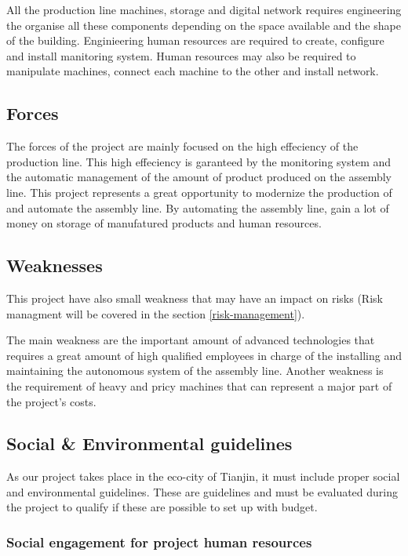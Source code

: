 All the production line machines, storage and digital network requires engineering the organise all these components depending on the space available and the shape of the building.
Enginieering human resources are required to create, configure and install manitoring system.
Human resources may also be required to manipulate machines, connect each machine to the other and install network.

\subsection{Forces}

The forces of the project are mainly focused on the high effeciency of the production line.
This high effeciency is garanteed by the monitoring system and the automatic management of the amount of product produced on the assembly line.
This project represents a great opportunity to modernize the production of \moldco and automate the assembly line.
By automating the assembly line, \moldco gain a lot of money on storage of manufatured products and human resources.

\subsection{Weaknesses}

This project have also small weakness that may have an impact on risks
(Risk managment will be covered in the section \ref{risk-management}).

The main weakness are the important amount of advanced technologies that requires a great amount of high qualified employees in charge of the installing and maintaining the autonomous system of the assembly line.
Another weakness is the requirement of heavy and pricy machines that can represent a major part of the project's costs.

\subsection{Social \& Environmental guidelines}

As our project takes place in the eco-city of Tianjin, it must include proper social and environmental guidelines.
These are guidelines and must be evaluated during the project to qualify if these are possible to set up with \moldco budget.

\subsubsection{Social engagement for project human resources}

